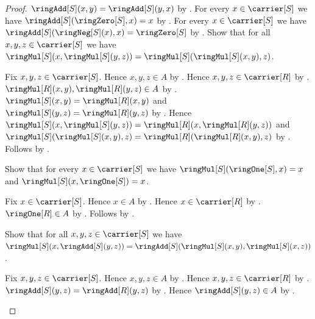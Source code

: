 \begin{proof}
        $\ringAdd[S](x,y)=\ringAdd[S](y,x)$ by \auto.
    For every $x\in\carrier[S]$ we have
        $\ringAdd[S](\ringZero[S],x)=x$ by
        .
    For every $x\in\carrier[S]$ we have
        $\ringAdd[S](\ringNeg[S](x),x)=\ringZero[S]$ by
        .
    Show that for all $x,y,z\in\carrier[S]$ we have
        $\ringMul[S](x,\ringMul[S](y,z))
            =\ringMul[S](\ringMul[S](x,y),z)$.
    \begin{subproof}
        Fix $x,y,z\in\carrier[S]$.
        Hence $x,y,z\in A$ by .
        Hence $x,y,z\in\carrier[R]$ by .
        $\ringMul[R](x,y),\ringMul[R](y,z)\in A$ by
            .
        $\ringMul[S](x,y)=\ringMul[R](x,y)$ and
            $\ringMul[S](y,z)=\ringMul[R](y,z)$ by
            .
        Hence
            $\ringMul[S](x,\ringMul[S](y,z))
                =\ringMul[R](x,\ringMul[R](y,z))$ and
            $\ringMul[S](\ringMul[S](x,y),z)
                =\ringMul[R](\ringMul[R](x,y),z)$ by
            .
        Follows by .
    \end{subproof}
    Show that for every $x\in\carrier[S]$ we have
        $\ringMul[S](\ringOne[S],x)=x$ and
        $\ringMul[S](x,\ringOne[S])=x$.
    \begin{subproof}
        Fix $x\in\carrier[S]$.
        Hence $x\in A$ by .
        Hence $x\in\carrier[R]$ by .
        $\ringOne[R]\in A$ by .
        Follows by
            .
    \end{subproof}
    Show that for all $x,y,z\in\carrier[S]$ we have
        $\ringMul[S](x,\ringAdd[S](y,z))
            =\ringAdd[S](\ringMul[S](x,y),\ringMul[S](x,z))$.
    \begin{subproof}
        Fix $x,y,z\in\carrier[S]$.
        Hence $x,y,z\in A$ by .
        Hence $x,y,z\in\carrier[R]$ by .
        $\ringAdd[S](y,z)=\ringAdd[R](y,z)$ by
            .
        Hence $\ringAdd[S](y,z)\in A$ by
            .

\end{subproof}
\end{proof}
